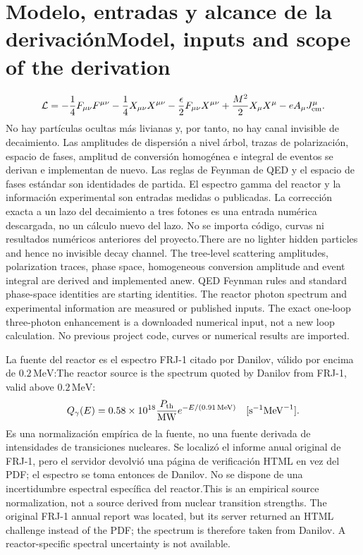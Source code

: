 \documentclass[11pt]{article}
\newcommand{\B}[2]{\ifspanish#2\else#1\fi}
\begin{document}
\section{\B{Model, inputs and scope of the derivation}{Modelo, entradas y alcance de la derivación}}
\begin{equation}
\mathcal L=-\frac14F_{\mu\nu}F^{\mu\nu}-\frac14X_{\mu\nu}X^{\mu\nu}
-\frac\epsilon2 F_{\mu\nu}X^{\mu\nu}+\frac{M^2}{2}X_\mu X^\mu-eA_\mu J^\mu_{\rm em}.
\end{equation}
\B{There are no lighter hidden particles and hence no invisible decay channel. The tree-level scattering amplitudes, polarization traces, phase space, homogeneous conversion amplitude and event integral are derived and implemented anew. QED Feynman rules and standard phase-space identities are starting identities. The reactor photon spectrum and experimental information are measured or published inputs. The exact one-loop three-photon enhancement is a downloaded numerical input, not a new loop calculation. No previous project code, curves or numerical results are imported.}
{No hay partículas ocultas más livianas y, por tanto, no hay canal invisible de decaimiento. Las amplitudes de dispersión a nivel árbol, trazas de polarización, espacio de fases, amplitud de conversión homogénea e integral de eventos se derivan e implementan de nuevo. Las reglas de Feynman de QED y el espacio de fases estándar son identidades de partida. El espectro gamma del reactor y la información experimental son entradas medidas o publicadas. La corrección exacta a un lazo del decaimiento a tres fotones es una entrada numérica descargada, no un cálculo nuevo del lazo. No se importa código, curvas ni resultados numéricos anteriores del proyecto.}

\B{The reactor source is the spectrum quoted by Danilov from FRJ-1, valid above $0.2\,\mathrm{MeV}$:}
{La fuente del reactor es el espectro FRJ-1 citado por Danilov, válido por encima de $0.2\,\mathrm{MeV}$:}
\begin{equation}
 Q_\gamma(E)=0.58\times10^{18}\frac{P_{\rm th}}{\mathrm{MW}}
 e^{-E/(0.91\,\mathrm{MeV})}\quad[\mathrm{s}^{-1}\mathrm{MeV}^{-1}].
\end{equation}
\B{This is an empirical source normalization, not a source derived from nuclear transition strengths. The original FRJ-1 annual report was located, but its server returned an HTML challenge instead of the PDF; the spectrum is therefore taken from Danilov. A reactor-specific spectral uncertainty is not available.}
{Es una normalización empírica de la fuente, no una fuente derivada de intensidades de transiciones nucleares. Se localizó el informe anual original de FRJ-1, pero el servidor devolvió una página de verificación HTML en vez del PDF; el espectro se toma entonces de Danilov. No se dispone de una incertidumbre espectral específica del reactor.}
\end{document}
